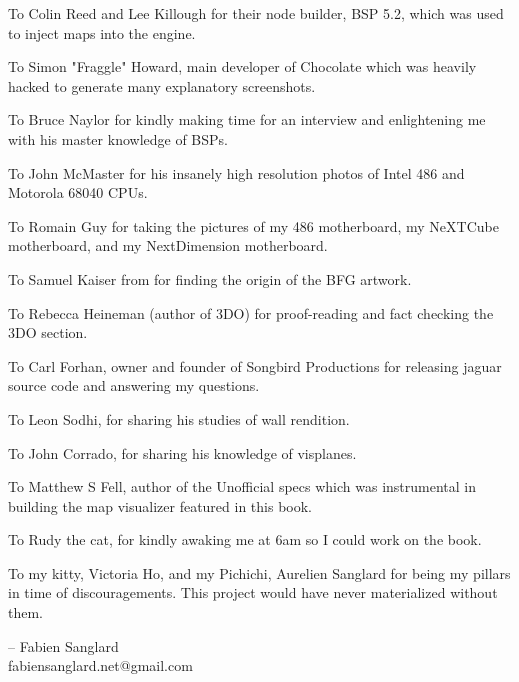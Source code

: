 \par
To Colin Reed and Lee Killough for their node builder, BSP 5.2, which was used to inject maps into the\doom{} engine.\\
\par
To Simon "Fraggle" Howard, main developer of Chocolate \doom{} which was heavily hacked to generate many explanatory screenshots.\\
\par
To Bruce Naylor for kindly making time for an interview and enlightening me with his master knowledge of BSPs.\\
\par
To John McMaster for his insanely high resolution photos of Intel 486 and Motorola 68040 CPUs.\\
\par
To Romain Guy for taking the pictures of my 486 motherboard, my NeXTCube motherboard, and my NextDimension motherboard.\\
\par
To Samuel Kaiser from  for finding the origin of the BFG artwork.\\
\par
To Rebecca Heineman (author of \doom{} 3DO) for proof-reading and fact checking the 3DO section.\\
\par
To Carl Forhan, owner and founder of Songbird Productions for releasing \doom{} jaguar source code and answering my questions.\\
\par
To Leon Sodhi, for sharing his studies of \doom{} wall rendition.\\
\par
To John Corrado, for sharing his knowledge of visplanes.\\
\par
To Matthew S Fell, author of the Unofficial \doom{} specs which was instrumental in building the map visualizer featured in this book.\\
\par
To Rudy the cat, for kindly awaking me at 6am so I could work on the book.\\
\par
To my kitty, Victoria Ho, and my Pichichi, Aurelien Sanglard for being my pillars in time of discouragements. This project would have never materialized without them.\\ 
\par
\thispagestyle{plain} %
-- Fabien Sanglard\\
fabiensanglard.net@gmail.com
